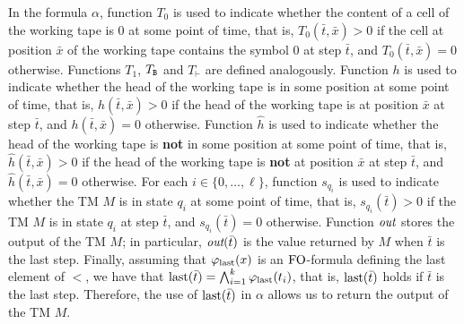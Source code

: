 In the formula $\alpha$, function $T_0$ is used to indicate whether the content of a cell of the working tape is 0 at some point of time, that is, $T_0(\bar{t},\bar{x}) > 0$ if the cell at position $\bar{x}$ of the working tape contains the symbol 0 at step $\bar{t}$, and $T_0(\bar{t},\bar{x}) = 0$ otherwise. Functions $T_1$, $T_{\mathtt{B}}$ and $T_{\vdash}$ are defined analogously. Function $h$ is used to indicate whether the head of the working tape is in some position at some point of time, that is, $h(\bar{t},\bar{x}) > 0$ if the head of the working tape is at position $\bar{x}$ at step $\bar{t}$, and $h(\bar{t},\bar{x}) = 0$ otherwise. 
Function $\hat{h}$ is used to indicate whether the head of the working tape is {\bf not} in some position at some point of time, that is, $\hat{h}(\bar{t},\bar{x}) > 0$ if the head of the working tape is {\bf not} at position $\bar{x}$ at step $\bar{t}$, and $\hat{h}(\bar{t},\bar{x}) = 0$ otherwise. For each $i \in \{0, \ldots, \ell\}$, function 
$s_{q_i}$ is used to indicate whether the TM $M$ is in state $q_i$ at some point of time, that is, $s_{q_i}(\bar{t}) > 0$ if the TM $M$ is in state $q_i$ at step $\bar{t}$, and $s_{q_i}(\bar{t}) = 0$ otherwise. Function $\text{\it out}$ stores the output of the TM $M$; in particular, $\text{\it out}(\bar t)$ is the value returned by $M$ when $\bar t$ is the last step. Finally, assuming that $\varphi_{\text{\rm last}}(x)$ is an ${\rm FO}$-formula defining the last element of $<$, we have that $\operatorname{last}(\bar t) = \bigwedge_{i=1}^k \varphi_{\text{\rm last}}(t_i)$, that is, $\operatorname{last}(\bar t)$ holds if $\bar t$ is the last step. Therefore, the use of $\operatorname{last}(\bar t)$ in $\alpha$ allows us to return the output of the TM $M$. 

